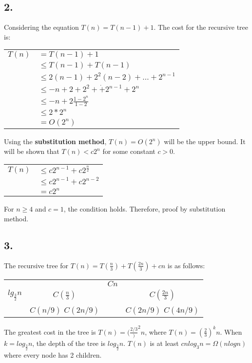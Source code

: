 \documentclass[11pt,letterpaper]{article}
\begin{document}
\subsection*{2.}
Considering the equation $T(n) = T(n - 1) + 1$. The cost for the recursive tree is:

\begin{tabular}{r l}
	$T(n)$		& $ = T(n - 1) + 1 $\\
				& $ \leq T(n - 1) + T(n - 1) $ \\
				& $ \leq 2(n-1) + 2^2(n-2) + \ldots + 2^{n-1} $ \\
				& $ \leq -n + 2 + 2^2 + \dot + 2^{n-1} + 2^n $ \\
				& $ \leq -n + 2 \frac{1 - 2^n}{1 - 2} $ \\
				& $ \leq 2 * 2^n $ \\
				& $ = O(2^n) $\\
\end{tabular}

Using the \textbf{substitution method}, $T(n) = O(2^n)$ will be the upper bound. It will be shown that 
$T(n) < c2^n$ for some constant $c > 0$. 

\begin{tabular}{r l}
	$T(n)$		& $ \leq c 2^{n-1} + c2^{\frac{n}{2}}$ \\
				& $ \leq c 2^{n-1} + c 2^{n-2}$ \\
				& $ = c 2^n$ \\ 
\end{tabular}

For $n \geq 4$ and $c=1$, the condition holds. Therefore, proof by substitution method.


\subsection*{3.}
The recursive tree for $T(n) = T(\frac{n}{3}) + T(\frac{2n}{3}) + cn$ is as follows:

\begin{tabular}{ l | c c c}
				&					&	$Cn$			&	\\
$lg_{\frac{3}{2}	}n$	&	$C(\frac{n}{3})$	&					&	$C(\frac{2n}{3})$ \\
				&	$C(n/9)$	$C(2n/9)$&					&	$C(2n/9)$	$C(4n/9)$\\
\end{tabular}

The greatest cost in the tree is $T(n) = (\frac{2/3})^2 n $, where $T(n) = (\frac{2}{3})^k n$. When
$k = log_{\frac{3}{2}} n$, the depth of the tree is $log_{\frac{3}{2}} n$. $T(n)$ is at least 
$cn log_3 n = \Omega({n log n})$ where every node has 2 children.
\end{document}
